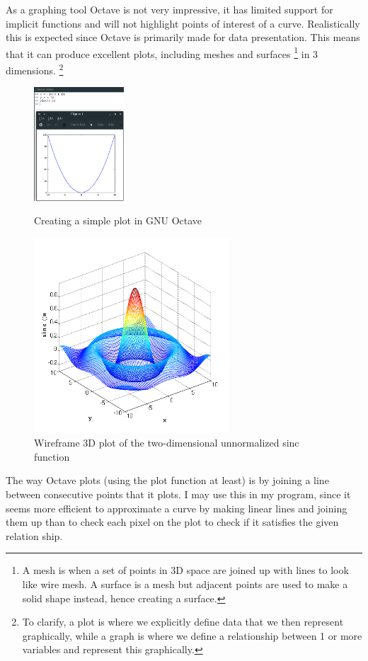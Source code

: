\documentclass[../../../main.tex]{subfiles}
\begin{document}
As a graphing tool Octave is not very impressive, it has limited support for implicit functions and will not highlight points of interest of a curve. Realistically this is expected since Octave is primarily made for data presentation. This means that it can produce excellent plots, including meshes and surfaces
\footnote{A mesh is when a set of points in 3D space are joined up with lines to look like wire mesh. A surface is a mesh but adjacent points are used to make a solid shape instead, hence creating a surface.}
 in 3 dimensions.
\footnote{To clarify, a plot is where we explicitly define data that we then represent graphically, while a graph is where we define a relationship between 1 or more variables and represent this graphically.}
\begin{figure}[H]
\centering
\begin{minipage}{.7\textwidth}
	\centering
  	\includegraphics[width=0.3\textwidth]{images/octavePlot}
	\caption{Creating a simple plot in GNU Octave}
	\label{fig:octavePlot}
\end{minipage}%
\begin{minipage}{.3\textwidth}
	\centering
	\includegraphics[width=0.65\textwidth]{images/matlabMesh}
	\caption{Wireframe 3D plot of the two-dimensional unnormalized sinc function}
\end{minipage}
\end{figure}
The way Octave plots (using the plot function at least) is by joining a line between consecutive points that it plots. I may use this in my program, since it seems more efficient to approximate a curve by making linear lines and joining them up than to check each pixel on the plot to check if it satisfies the given relation ship.
\end{document}
